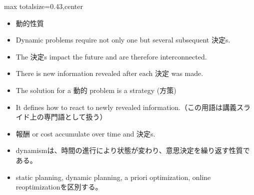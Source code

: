 \clearpage
{}
\begin{minipage}[t]{0.405\textwidth}
\begin{adjustbox}{max totalsize={\textwidth}{0.43\textheight},center}
\begin{minipage}{\textwidth}\scriptsize
{}\begin{itemize}
\item 動的性質
\item Dynamic problems require not only one but several subsequent 決定s.
\item The 決定s impact the future and are therefore interconnected.
\item There is new information revealed after each 決定 was made.
\item The solution for a 動的 problem is a strategy (方策)
\item It defines how to react to newly revealed information.（この用語は講義スライド上の専門語として扱う）
\item 報酬 or cost accumulate over time and 決定s.
\end{itemize}\begin{itemize}
\item dynamismは、時間の進行により状態が変わり、意思決定を繰り返す性質である。
\item static planning, dynamic planning, a priori optimization, online reoptimizationを区別する。
\end{itemize}
\end{minipage}
\end{adjustbox}
\end{minipage}\hfill
